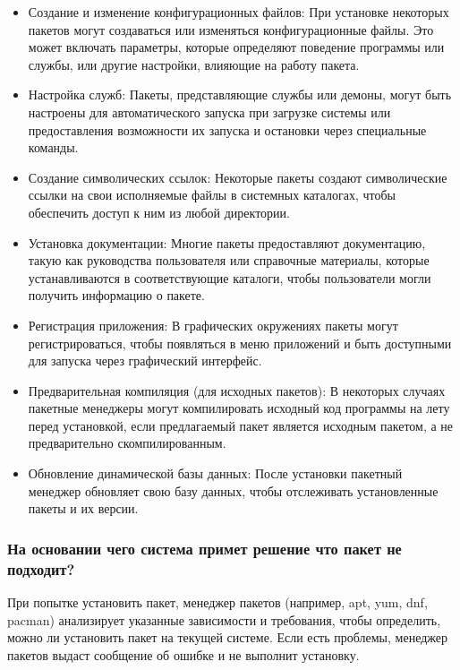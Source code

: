 \documentclass[oneside, final, 14pt]{extreport} %
\begin{document}
\begin{itemize}
    \item Создание и изменение конфигурационных файлов: При установке некоторых пакетов могут создаваться или изменяться конфигурационные файлы. Это может включать параметры, которые определяют поведение программы или службы, или другие настройки, влияющие на работу пакета.
    \item Настройка служб: Пакеты, представляющие службы или демоны, могут быть настроены для автоматического запуска при загрузке системы или предоставления возможности их запуска и остановки через специальные команды.
    \item Создание символических ссылок: Некоторые пакеты создают символические ссылки на свои исполняемые файлы в системных каталогах, чтобы обеспечить доступ к ним из любой директории.
    \item Установка документации: Многие пакеты предоставляют документацию, такую как руководства пользователя или справочные материалы, которые устанавливаются в соответствующие каталоги, чтобы пользователи могли получить информацию о пакете.
    \item Регистрация приложения: В графических окружениях пакеты могут регистрироваться, чтобы появляться в меню приложений и быть доступными для запуска через графический интерфейс.
    \item Предварительная компиляция (для исходных пакетов): В некоторых случаях пакетные менеджеры могут компилировать исходный код программы на лету перед установкой, если предлагаемый пакет является исходным пакетом, а не предварительно скомпилированным.
    \item Обновление динамической базы данных: После установки пакетный менеджер обновляет свою базу данных, чтобы отслеживать установленные пакеты и их версии.
\end{itemize}

\subsubsection{На основании чего система примет решение что пакет не подходит?}

При попытке установить пакет, менеджер пакетов (например, apt, yum, dnf, pacman) анализирует указанные зависимости и требования, чтобы определить, можно ли установить пакет на текущей системе. Если есть проблемы, менеджер пакетов выдаст сообщение об ошибке и не выполнит установку.
\end{document}

